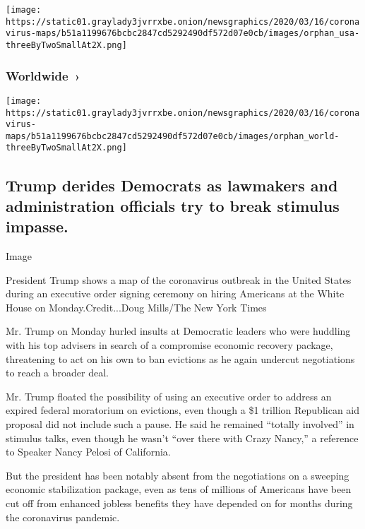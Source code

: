 \texttt{[image: https://static01.graylady3jvrrxbe.onion/newsgraphics/2020/03/16/coronavirus-maps/b51a1199676bcbc2847cd5292490df572d07e0cb/images/orphan\_usa-threeByTwoSmallAt2X.png]}

\href{https://www.nytimes3xbfgragh.onion/interactive/2020/world/coronavirus-maps.html}{}

\hypertarget{worldwide-}{%
\subsubsection{Worldwide~›}\label{worldwide-}}

\texttt{[image: https://static01.graylady3jvrrxbe.onion/newsgraphics/2020/03/16/coronavirus-maps/b51a1199676bcbc2847cd5292490df572d07e0cb/images/orphan\_world-threeByTwoSmallAt2X.png]}

\hypertarget{trump-derides-democrats-as-lawmakers-and-administration-officials-try-to-break-stimulus-impasse}{%
\subsection{Trump derides Democrats as lawmakers and administration
officials try to break stimulus
impasse.}\label{trump-derides-democrats-as-lawmakers-and-administration-officials-try-to-break-stimulus-impasse}}

Image

President Trump shows a map of the coronavirus outbreak in the United
States during an executive order signing ceremony on hiring Americans at
the White House on Monday.Credit...Doug Mills/The New York Times

Mr. Trump on Monday hurled insults at Democratic leaders who were
huddling with his top advisers in search of a compromise economic
recovery package, threatening to act on his own to ban evictions as he
again undercut negotiations to reach a broader deal.

Mr. Trump floated the possibility of using an executive order to address
an expired federal moratorium on evictions, even though a \$1 trillion
Republican aid proposal did not include such a pause. He said he
remained ``totally involved'' in stimulus talks, even though he wasn't
``over there with Crazy Nancy,'' a reference to Speaker Nancy Pelosi of
California.

But the president has been notably absent from the negotiations on a
sweeping economic stabilization package, even as tens of millions of
Americans have been cut off from enhanced jobless benefits they have
depended on for months during the coronavirus pandemic.

